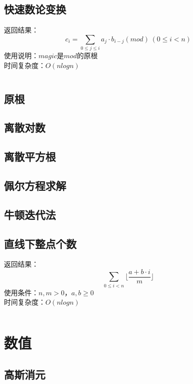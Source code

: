 \documentclass[a4paper]{article}
\newcommand{\cppcode}[1]{
    \inputminted[mathescape]{cpp}{source/#1}
}
\begin{document}
\subsection{快速数论变换}

返回结果：$$c_i=\sum_{0 \leq j \leq i} a_j \cdot b_{i-j} (mod) \ (0 \leq i < n)$$
\indent 使用说明：$magic$是$mod$的原根\\
\indent 时间复杂度：$O(n log n)$

\cppcode{number-theory/number-theoretic-transform.cpp}

\subsection{原根}

\subsection{离散对数}

\subsection{离散平方根}

\subsection{佩尔方程求解}

\subsection{牛顿迭代法}

\subsection{直线下整点个数}

返回结果：$$\sum_{0 \leq i < n} \lfloor \frac{a + b \cdot i}{m} \rfloor$$
\indent 使用条件：$n, m > 0$，$a, b \geq 0$\\
\indent 时间复杂度：$O(n log n)$

\cppcode{number-theory/lattice-count.cpp}

\section{数值}

\subsection{高斯消元}
\end{document}
